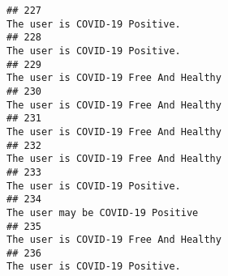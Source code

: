 \documentclass[
]{article}
\begin{document}
\begin{verbatim}
## 227                                                                                                                                                                                                                                     The user is COVID-19 Positive.
## 228                                                                                                                                                                                                                                     The user is COVID-19 Positive.
## 229                                                                                                                                                                                                                              The user is COVID-19 Free And Healthy
## 230                                                                                                                                                                                                                              The user is COVID-19 Free And Healthy
## 231                                                                                                                                                                                                                              The user is COVID-19 Free And Healthy
## 232                                                                                                                                                                                                                              The user is COVID-19 Free And Healthy
## 233                                                                                                                                                                                                                                     The user is COVID-19 Positive.
## 234                                                                                                                                                                                                                                  The user may be COVID-19 Positive
## 235                                                                                                                                                                                                                              The user is COVID-19 Free And Healthy
## 236                                                                                                                                                                                                                                     The user is COVID-19 Positive.

\end{verbatim}
\end{document}
